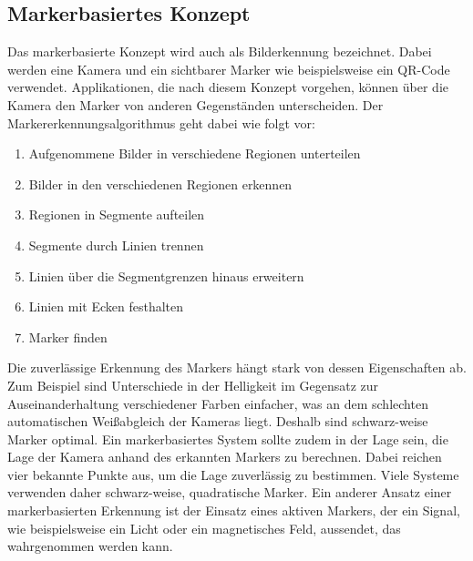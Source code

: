 \documentclass[conference]{IEEEtran}
\begin{document}
\subsection{Markerbasiertes Konzept}
Das markerbasierte Konzept wird auch als Bilderkennung bezeichnet. Dabei werden eine Kamera und ein sichtbarer Marker wie beispielsweise ein QR-Code verwendet. Applikationen, die nach diesem Konzept vorgehen, können über die Kamera den Marker von anderen Gegenständen unterscheiden. Der Markererkennungsalgorithmus geht dabei wie folgt vor:
\begin{enumerate}
	\item Aufgenommene Bilder in verschiedene Regionen unterteilen
	\item Bilder in den verschiedenen Regionen erkennen
	\item Regionen in Segmente aufteilen
	\item Segmente durch Linien trennen
	\item Linien über die Segmentgrenzen hinaus erweitern
	\item Linien mit Ecken festhalten
	\item Marker finden
\end{enumerate}
\autocite{aggarwal2019augmented} Die zuverlässige Erkennung des Markers hängt stark von dessen Eigenschaften ab. Zum Beispiel sind Unterschiede in der Helligkeit im Gegensatz zur Auseinanderhaltung verschiedener Farben einfacher, was an dem schlechten automatischen Weißabgleich der Kameras liegt. Deshalb sind schwarz-weise Marker optimal. Ein markerbasiertes System sollte zudem in der Lage sein, die Lage der Kamera anhand des erkannten Markers zu berechnen. Dabei reichen vier bekannte Punkte aus, um die Lage zuverlässig zu bestimmen. Viele Systeme verwenden daher schwarz-weise, quadratische Marker.\autocite{siltanen2012theory} Ein anderer Ansatz einer markerbasierten Erkennung ist der Einsatz eines aktiven Markers, der ein Signal, wie beispielsweise ein Licht oder ein magnetisches Feld, aussendet, das wahrgenommen werden kann.\autocite{bostanci2013user}
\end{document}
